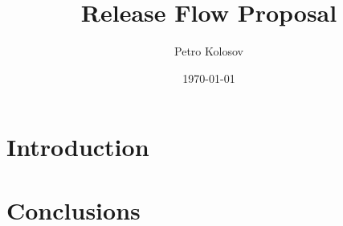 \documentclass[12pt,letterpaper,oneside,reqno]{amsart}
\title[Release Flow Proposal]
{Release Flow Proposal}
\author[Petro Kolosov]{Petro Kolosov}
\date{\today}
\numberwithin{equation}{section}
\begin{document}
    \begin{abstract}
        
    \end{abstract}

    \maketitle

    \tableofcontents


    \section{Introduction} \label{sec:introduction}
    


    \section{Conclusions}\label{sec:conclusions}
    

    
    
\end{document}
